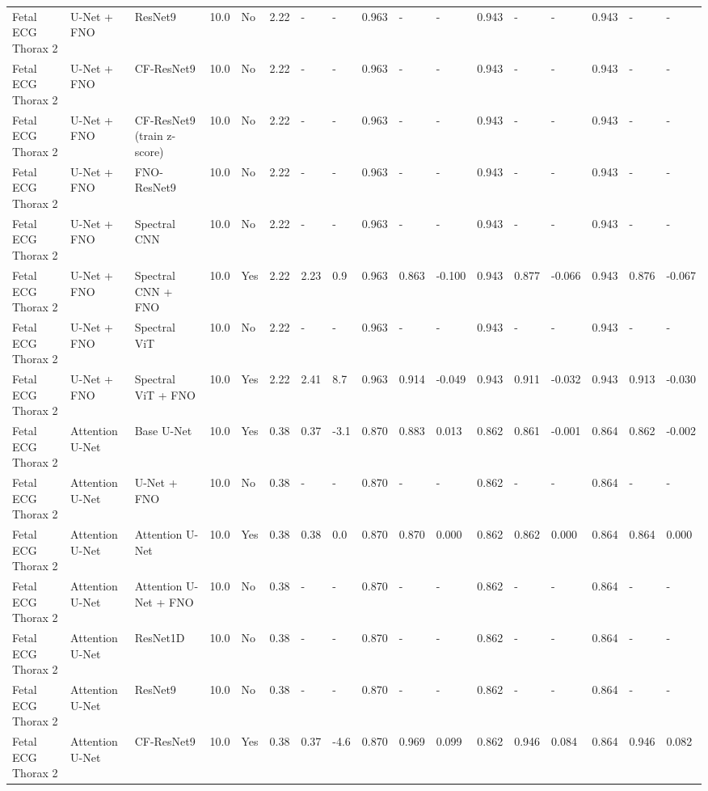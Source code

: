 \begin{longtable}{lllllllllllllllll}
Fetal ECG Thorax 2 & U-Net + FNO & ResNet9 & 10.0 & No & 2.22 & - & - & 0.963 & - & - & 0.943 & - & - & 0.943 & - & - \\
Fetal ECG Thorax 2 & U-Net + FNO & CF-ResNet9 & 10.0 & No & 2.22 & - & - & 0.963 & - & - & 0.943 & - & - & 0.943 & - & - \\
Fetal ECG Thorax 2 & U-Net + FNO & CF-ResNet9 (train z-score) & 10.0 & No & 2.22 & - & - & 0.963 & - & - & 0.943 & - & - & 0.943 & - & - \\
Fetal ECG Thorax 2 & U-Net + FNO & FNO-ResNet9 & 10.0 & No & 2.22 & - & - & 0.963 & - & - & 0.943 & - & - & 0.943 & - & - \\
Fetal ECG Thorax 2 & U-Net + FNO & Spectral CNN & 10.0 & No & 2.22 & - & - & 0.963 & - & - & 0.943 & - & - & 0.943 & - & - \\
Fetal ECG Thorax 2 & U-Net + FNO & Spectral CNN + FNO & 10.0 & Yes & 2.22 & 2.23 & 0.9 & 0.963 & 0.863 & -0.100 & 0.943 & 0.877 & -0.066 & 0.943 & 0.876 & -0.067 \\
Fetal ECG Thorax 2 & U-Net + FNO & Spectral ViT & 10.0 & No & 2.22 & - & - & 0.963 & - & - & 0.943 & - & - & 0.943 & - & - \\
Fetal ECG Thorax 2 & U-Net + FNO & Spectral ViT + FNO & 10.0 & Yes & 2.22 & 2.41 & 8.7 & 0.963 & 0.914 & -0.049 & 0.943 & 0.911 & -0.032 & 0.943 & 0.913 & -0.030 \\
Fetal ECG Thorax 2 & Attention U-Net & Base U-Net & 10.0 & Yes & 0.38 & 0.37 & -3.1 & 0.870 & 0.883 & 0.013 & 0.862 & 0.861 & -0.001 & 0.864 & 0.862 & -0.002 \\
Fetal ECG Thorax 2 & Attention U-Net & U-Net + FNO & 10.0 & No & 0.38 & - & - & 0.870 & - & - & 0.862 & - & - & 0.864 & - & - \\
Fetal ECG Thorax 2 & Attention U-Net & Attention U-Net & 10.0 & Yes & 0.38 & 0.38 & 0.0 & 0.870 & 0.870 & 0.000 & 0.862 & 0.862 & 0.000 & 0.864 & 0.864 & 0.000 \\
Fetal ECG Thorax 2 & Attention U-Net & Attention U-Net + FNO & 10.0 & No & 0.38 & - & - & 0.870 & - & - & 0.862 & - & - & 0.864 & - & - \\
Fetal ECG Thorax 2 & Attention U-Net & ResNet1D & 10.0 & No & 0.38 & - & - & 0.870 & - & - & 0.862 & - & - & 0.864 & - & - \\
Fetal ECG Thorax 2 & Attention U-Net & ResNet9 & 10.0 & No & 0.38 & - & - & 0.870 & - & - & 0.862 & - & - & 0.864 & - & - \\
Fetal ECG Thorax 2 & Attention U-Net & CF-ResNet9 & 10.0 & Yes & 0.38 & 0.37 & -4.6 & 0.870 & 0.969 & 0.099 & 0.862 & 0.946 & 0.084 & 0.864 & 0.946 & 0.082 \\

\end{longtable}
